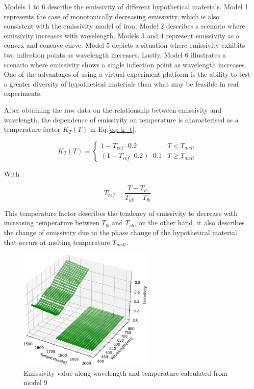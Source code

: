 Models 1 to 6 describe the emissivity of different hypothetical 
materials. Model 1 represents the case of monotonically decreasing 
emissivity, which is also consistent with the emissivity model of 
iron. Model 2 describes a scenario where emissivity increases with 
wavelength. Models 3 and 4 represent emissivity as a convex and 
concave curve. Model 5 depicts a situation where emissivity exhibits 
two inflection points as wavelength increases. Lastly, Model 6 
illustrates a scenario where emissivity shows a single inflection 
point as wavelength increases. One of the advantages of using a 
virtual experiment platform is the ability to test a greater 
diversity of hypothetical materials than what may be feasible in real 
experiments.


After obtaining the raw data on the relationship between emissivity 
and wavelength, the dependence of emissivity on temperature is characterised
as a temperature factor $K_T(T)$ in Eq.\ref{eq: k_t}.

\begin{equation}
  \label{eq: k_t}
  K_T(T)=\begin{cases}
    1 - T_{ref} \cdot 0.2 &   T<T_{melt}\\
    \left(1 - T_{ref} \cdot 0.2 \right) \cdot 0.1 &  T\geq T_{melt}
  \end{cases}
\end{equation}


With 

\begin{equation}
  \label{eq: t_ref}
  T_{ref}=\frac{T - T_{lb}}{T_{ub} - T_{lb}}
\end{equation}


This temperature factor describes the tendency 
of emissivity to decrease with increasing temperature between $T_{lb}$ and $T_{ub}$, 
on the other hand, it also describes the change of emissivity due to the 
phase change of the hypothetical material that occurs at melting 
temperature $T_{melt}$.

\begin{figure}[htbp]
  \centering
  \includegraphics[width=0.6\textwidth]{figures/emissivity_model.jpg}
  \caption{Emissivity value along wavelength and temperature calculated from model 9}
  \label{fig: emissivity_model}
\end{figure}



